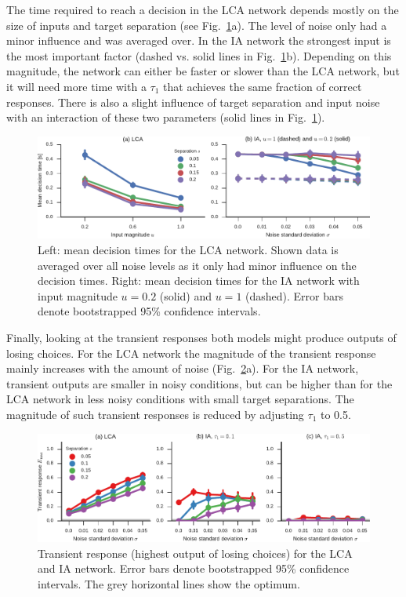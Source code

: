 \documentclass[10pt,letterpaper]{article}
\begin{document}
The time required to reach a decision in the LCA network depends mostly on the size of inputs and target separation (see Fig.~\ref{fig:time}a).
The level of noise only had a minor influence and was averaged over.
In the IA network the strongest input is the most important factor (dashed vs. solid lines in Fig.~\ref{fig:time}b).
Depending on this magnitude, the network can either be faster or slower than the LCA network, but it will need more time with a $\tau_1$ that achieves the same fraction of correct responses.
There is also a slight influence of target separation and input noise with an interaction of these two parameters (solid lines in Fig.~\ref{fig:time}).
\begin{figure}[t]
    \centering
    \includegraphics{figures/time}
    \caption{
        Left: mean decision times for the LCA network. Shown data is averaged over all noise levels as it only had minor influence on the decision times.
        Right: mean decision times for the IA network with input magnitude $u = 0.2$ (solid) and $u = 1$ (dashed).
        Error bars denote bootstrapped 95\% confidence intervals.
    }\label{fig:time}
\end{figure}


Finally, looking at the transient responses both models might produce outputs of losing choices.
For the LCA network the magnitude of the transient response mainly increases with the amount of noise (Fig.~\ref{fig:transient}a).
For the IA network, transient outputs are smaller in noisy conditions, but can be higher than for the LCA network in less noisy conditions with small target separations.
The magnitude of such transient responses is reduced by adjusting $\tau_1$ to 0.5.
\begin{figure}
    \centering
    \includegraphics{figures/transient}
    \caption{
        Transient response (highest output of losing choices) for the LCA and IA network.
        Error bars denote bootstrapped 95\% confidence intervals.
        The grey horizontal lines show the optimum.
    }\label{fig:transient}
\end{figure}
\end{document}
